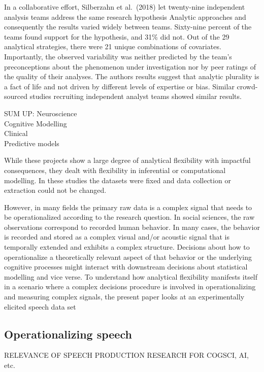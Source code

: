 \documentclass[
  english,
  man]{apa6}
\begin{document}
In a collaborative effort, Silberzahn et al.~(2018) let twenty-nine independent analysis teams address the same research hypothesis
Analytic approaches and consequently the results varied widely between teams.
Sixty-nine percent of the teams found support for the hypothesis, and 31\% did not.
Out of the 29 analytical strategies, there were 21 unique combinations of covariates.
Importantly, the observed variability was neither predicted by the team's preconceptions about the phenomenon under investigation nor by peer ratings of the quality of their analyses.
The authors results suggest that analytic plurality is a fact of life and not driven by different levels of expertise or bias.
Similar crowd-sourced studies recruiting independent analyst teams showed similar results.

SUM UP:
Neuroscience\\
Cognitive Modelling\\
Clinical\\
Predictive models

While these projects show a large degree of analytical flexibility with impactful consequences, they dealt with flexibility in inferential or computational modelling.
In these studies the datasets were fixed and data collection or extraction could not be changed.

However, in many fields the primary raw data is a complex signal that needs to be operationalized according to the research question.
In social sciences, the raw observations correspond to recorded human behavior.
In many cases, the behavior is recorded and stored as a complex visual and/or acoustic signal that is temporally extended and exhibits a complex structure.
Decisions about how to operationalize a theoretically relevant aspect of that behavior or the underlying cognitive processes might interact with downstream decisions about statistical modelling and vice verse.
To understand how analytical flexibility manifests itself in a scenario where a complex decisions procedure is involved in operationalizing and measuring complex signals, the present paper looks at an experimentally elicited speech data set

\hypertarget{operationalizing-speech}{%
\subsection{Operationalizing speech}\label{operationalizing-speech}}

RELEVANCE OF SPEECH PRODUCTION RESEARCH FOR COGSCI, AI, etc.
\end{document}
